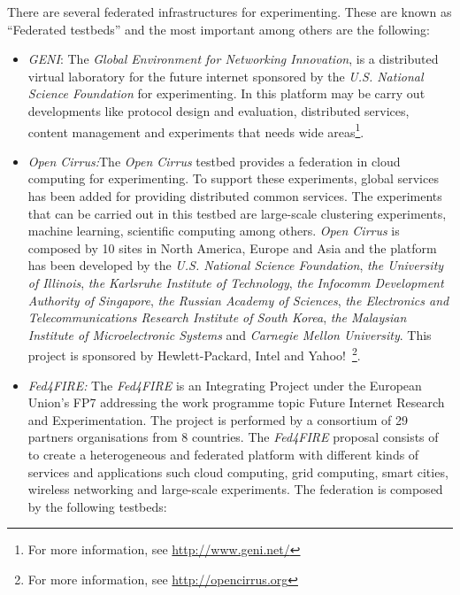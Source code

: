 There are several federated infrastructures for experimenting. These are known
as ``Federated testbeds'' and the most important among others are the following:
\begin{itemize}
\item \emph{GENI}: The \emph{Global Environment for Networking Innovation}, is a distributed virtual
laboratory for the future internet sponsored by the \emph{U.S. National Science Foundation} for
experimenting. In this platform may be carry out developments like protocol
design and evaluation, distributed services, content management and experiments
that needs wide areas\footnote{For more information, see
  \url{http://www.geni.net/}}.
\item \emph{Open
  Cirrus:}The \emph{Open Cirrus} testbed provides a federation in cloud computing for
experimenting. To support these experiments, global services has been added for
providing distributed common services. The experiments that can be carried out
in this testbed are large-scale clustering experiments, machine learning,
scientific computing among others. \emph{Open Cirrus} is composed by 10 sites in North
America, Europe and Asia and the platform has been developed by the
\emph{U.S. National Science Foundation}, \emph{the University of
  Illinois},\emph{ the Karlsruhe Institute of Technology}, \emph{the Infocomm Development Authority of Singapore},\emph{ the
Russian Academy of Sciences}, \emph{the Electronics and Telecommunications Research
Institute of South Korea}, \emph{the Malaysian Institute of Microelectronic
  Systems} and \emph{Carnegie Mellon University}. This project is sponsored by Hewlett-Packard, Intel
and Yahoo!~\footnote{For more information, see \url{http://opencirrus.org}}.

\item \emph{Fed4FIRE:} The \emph{Fed4FIRE} is an Integrating Project under the European
Union's \ac{FP7} addressing the work programme topic Future Internet Research
and Experimentation. The project is performed by a consortium of 29 partners
organisations from 8 countries. The \emph{Fed4FIRE}  proposal consists of to create a
heterogeneous and federated platform with different kinds of services and applications such
cloud computing, grid computing, smart cities, wireless networking and
large-scale experiments. The federation is composed by the following testbeds:


\end{itemize}
